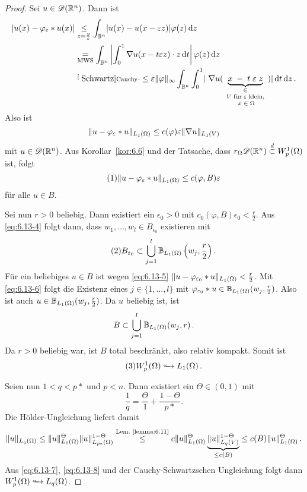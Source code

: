 \begin{proof}
  Sei $u\in\mathscr{D}(\mathbb{R}^n)$. Dann ist
  \begin{equation}
  \begin{split}
    \abs{u(x)-\varphi_\epsilon\ast u(x)}&\underset{z=\frac y\epsilon}\leq
    \int_{\B^n}\abs{u(x)-u(x-\epsilon z)}\varphi(z)\d z \\
    &\underset{\scriptsize\text{MWS}}=\int_{\B^n}\Abs{\int_0^1\nabla u(x-t\epsilon z)\cdot z\d t}\varphi(z)\d z \\
    &\stackrel[\scriptsize\text{Schwartz}]{\scriptsize\text{Cauchy-}}\leq
    \epsilon\norm\varphi_\infty\int_{\B^n}\int_0^1
    \abs{\
      \nabla u(\underbrace{x\;-\;t\;\epsilon\;z}_{\parbox{1.89cm}{\centering\scriptsize$\in V\;\text{für}\;\epsilon\;\text{klein},$ \\ $\; x\in\Omega$}})
    }\d t\d z\, .
  \end{split}
  \end{equation}
  Also ist
  \[
  \lVert u-\varphi_\varepsilon\ast u\rVert_{L_1(\Omega)}\leq c(\varphi)\varepsilon\lVert \nabla u\rVert_{L_1(V)}
  \]
  mit $u\in\mathscr{D}(\mathbb{R}^n)$. Aus Korollar~\ref{kor:6.6} und der Tatsache, dass $r_\Omega\mathscr{D}(\mathbb{R}^n)\overset d\subset W_p^1(\Omega)$ ist, folgt
  \[
  \eq{eq:6.13-5}
  \norm{u-\varphi_\epsilon\ast u}_{L_1(\Omega)}\leq c(\varphi, B)\epsilon
  \]
  für alle $u\in B$.

  Sei nun $r>0$ beliebig. Dann existiert ein $\epsilon_0>0$ mit $c_0(\varphi, B)\epsilon_0<\frac r2$. Aus \eqref{eq:6.13-4} folgt dann, dass $w_1,\ldots,w_l\in B_{\epsilon_0}$ existieren mit
  \[
  \eq{eq:6.13-6}
  B_{\epsilon_0}\subset\bigcup_{j=1}^l\B_{L_1(\Omega)}\left(w_j,\frac r2\right).
  \]
  Für ein beliebiges $u\in B$ ist wegen \eqref{eq:6.13-5} $\lVert u-\varphi_{\varepsilon_0}\ast u\rVert_{L_1(\Omega)}<\frac r2$. Mit \eqref{eq:6.13-6} folgt die Existenz eines $j\in\{1,\ldots,l\}$ mit $\varphi_{\varepsilon_0}\ast u\in\mathbb{B}_{L_1(\Omega)}(w_j,\frac r2)$. Also ist auch $u\in\mathbb{B}_{L_1(\Omega)}(w_j,\frac r2)$. Da $u$ beliebig ist, ist 
  \[ B\subset\bigcup_{j=1}^l\mathbb{B}_{L_1(\Omega)}(w_j,r)\, . \]
  Da $r>0$ beliebig war, ist $B$ total beschränkt, also relativ kompakt. Somit ist 
  \[ \eq{eq:6.13-7} W_p^1(\Omega)\hhookrightarrow L_1(\Omega)\, . \]
  
  Seien nun $1<q<p\ast$ und $p<n$. Dann existiert ein $\Theta\in(0,1)$ mit
  \[ \frac 1q=\frac \Theta1+\frac{1-\Theta}{p\ast}. \]
  Die Hölder-Ungleichung liefert damit
  \begin{dmath}
    \label{eq:6.13-8}
    \norm u_{L_q(\Omega)}\leq\norm u_{L_1(\Omega)}^\Theta\norm u_{L_{p\ast}(\Omega)}^{1-\Theta}
    \overset{\scriptsize\text{Lem.~\ref{lemma:6.11}}}\leq c\norm u_{L_1(\Omega)}^\Theta
    \underbrace{\norm u_{L_q(V)}^{1-\Theta}}_{\leq c(B)}
    \leq c(B)\norm u_{L_1(\Omega)}^\Theta\, .
  \end{dmath}
  Aus \eqref{eq:6.13-7}, \eqref{eq:6.13-8} und der Cauchy-Schwartzschen Ungleichung folgt dann $W_p^1(\Omega)\hhookrightarrow L_q(\Omega)$.
\end{proof}

